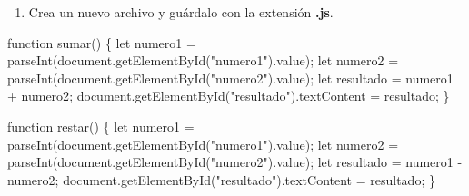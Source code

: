 \documentclass[
  a4paper,
  DIV=11,
  numbers=noendperiod,
  onepage,
  openany]{scrreprt}
\newenvironment{Shaded}{\begin{snugshade}}{\end{snugshade}}
\newcommand{\AttributeTok}[1]{\textcolor[rgb]{0.40,0.45,0.13}{#1}}
\newcommand{\BuiltInTok}[1]{\textcolor[rgb]{0.00,0.23,0.31}{#1}}
\newcommand{\FunctionTok}[1]{\textcolor[rgb]{0.28,0.35,0.67}{#1}}
\newcommand{\KeywordTok}[1]{\textcolor[rgb]{0.00,0.23,0.31}{#1}}
\newcommand{\NormalTok}[1]{\textcolor[rgb]{0.00,0.23,0.31}{#1}}
\newcommand{\OperatorTok}[1]{\textcolor[rgb]{0.37,0.37,0.37}{#1}}
\newcommand{\PreprocessorTok}[1]{\textcolor[rgb]{0.68,0.00,0.00}{#1}}
\newcommand{\StringTok}[1]{\textcolor[rgb]{0.13,0.47,0.30}{#1}}
\providecommand{\tightlist}{%
  \setlength{\itemsep}{0pt}\setlength{\parskip}{0pt}}\usepackage{longtable,booktabs,array}
\begin{document}
\begin{enumerate}
\def\labelenumi{\arabic{enumi}.}
\setcounter{enumi}{3}
\tightlist
\item
  Crea un nuevo archivo y guárdalo con la extensión \textbf{.js}.
\end{enumerate}

\begin{Shaded}
\begin{Highlighting}[]
\KeywordTok{function} \FunctionTok{sumar}\NormalTok{() \{}
    \KeywordTok{let}\NormalTok{ numero1 }\OperatorTok{=} \PreprocessorTok{parseInt}\NormalTok{(}\BuiltInTok{document}\OperatorTok{.}\FunctionTok{getElementById}\NormalTok{(}\StringTok{"numero1"}\NormalTok{)}\OperatorTok{.}\AttributeTok{value}\NormalTok{)}\OperatorTok{;}
    \KeywordTok{let}\NormalTok{ numero2 }\OperatorTok{=} \PreprocessorTok{parseInt}\NormalTok{(}\BuiltInTok{document}\OperatorTok{.}\FunctionTok{getElementById}\NormalTok{(}\StringTok{"numero2"}\NormalTok{)}\OperatorTok{.}\AttributeTok{value}\NormalTok{)}\OperatorTok{;}
    \KeywordTok{let}\NormalTok{ resultado }\OperatorTok{=}\NormalTok{ numero1 }\OperatorTok{+}\NormalTok{ numero2}\OperatorTok{;}
    \BuiltInTok{document}\OperatorTok{.}\FunctionTok{getElementById}\NormalTok{(}\StringTok{"resultado"}\NormalTok{)}\OperatorTok{.}\AttributeTok{textContent} \OperatorTok{=}\NormalTok{ resultado}\OperatorTok{;}
\NormalTok{\}}

\KeywordTok{function} \FunctionTok{restar}\NormalTok{() \{}
    \KeywordTok{let}\NormalTok{ numero1 }\OperatorTok{=} \PreprocessorTok{parseInt}\NormalTok{(}\BuiltInTok{document}\OperatorTok{.}\FunctionTok{getElementById}\NormalTok{(}\StringTok{"numero1"}\NormalTok{)}\OperatorTok{.}\AttributeTok{value}\NormalTok{)}\OperatorTok{;}
    \KeywordTok{let}\NormalTok{ numero2 }\OperatorTok{=} \PreprocessorTok{parseInt}\NormalTok{(}\BuiltInTok{document}\OperatorTok{.}\FunctionTok{getElementById}\NormalTok{(}\StringTok{"numero2"}\NormalTok{)}\OperatorTok{.}\AttributeTok{value}\NormalTok{)}\OperatorTok{;}
    \KeywordTok{let}\NormalTok{ resultado }\OperatorTok{=}\NormalTok{ numero1 }\OperatorTok{{-}}\NormalTok{ numero2}\OperatorTok{;}
    \BuiltInTok{document}\OperatorTok{.}\FunctionTok{getElementById}\NormalTok{(}\StringTok{"resultado"}\NormalTok{)}\OperatorTok{.}\AttributeTok{textContent} \OperatorTok{=}\NormalTok{ resultado}\OperatorTok{;}
\NormalTok{\}}


\end{Highlighting}
\end{Shaded}
\end{document}
